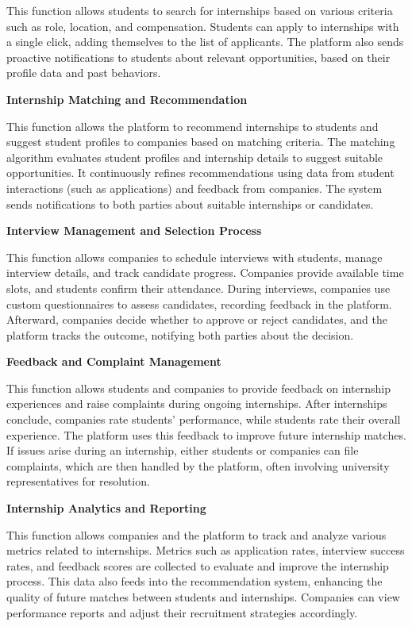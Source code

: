 This function allows students to search for internships based on various criteria such as role, location, and compensation. Students can apply to internships with a single click, adding themselves to the list of applicants. The platform also sends proactive notifications to students about relevant opportunities, based on their profile data and past behaviors.

\textbf{Internship Matching and Recommendation}

This function allows the platform to recommend internships to students and suggest student profiles to companies based on matching criteria. The matching algorithm evaluates student profiles and internship details to suggest suitable opportunities. It continuously refines recommendations using data from student interactions (such as applications) and feedback from companies. The system sends notifications to both parties about suitable internships or candidates.

\textbf{Interview Management and Selection Process}

This function allows companies to schedule interviews with students, manage interview details, and track candidate progress. Companies provide available time slots, and students confirm their attendance. During interviews, companies use custom questionnaires to assess candidates, recording feedback in the platform. Afterward, companies decide whether to approve or reject candidates, and the platform tracks the outcome, notifying both parties about the decision.

\textbf{Feedback and Complaint Management}

This function allows students and companies to provide feedback on internship experiences and raise complaints during ongoing internships. After internships conclude, companies rate students' performance, while students rate their overall experience. The platform uses this feedback to improve future internship matches. If issues arise during an internship, either students or companies can file complaints, which are then handled by the platform, often involving university representatives for resolution.

\textbf{Internship Analytics and Reporting}

This function allows companies and the platform to track and analyze various metrics related to internships. Metrics such as application rates, interview success rates, and feedback scores are collected to evaluate and improve the internship process. This data also feeds into the recommendation system, enhancing the quality of future matches between students and internships. Companies can view performance reports and adjust their recruitment strategies accordingly.

